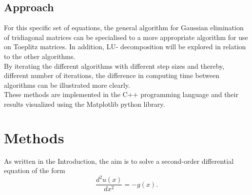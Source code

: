 \documentclass[10pt,a4paper]{article}
\begin{document}
\subsection{Approach}
For this specific set of equations, the general algorithm for Gaussian elimination of tridiagonal matrices can be specialised to a more appropriate algorithm for use on Toeplitz matrices. In addition, LU- decomposition will be explored in relation to the other algorithms.\\ By iterating the different algorithms with different step sizes and thereby, different number of iterations, the difference in computing time between algorithms can be illustrated more clearly. \\These methods are implemented in the C++ programming language and their results visualized using the Matplotlib python library.
\section{Methods}

As written in the Introduction, the aim is to solve a second-order differential equation of the form
$$\frac{d^2u(x)}{dx^2} = -g(x).$$
\end{document}
